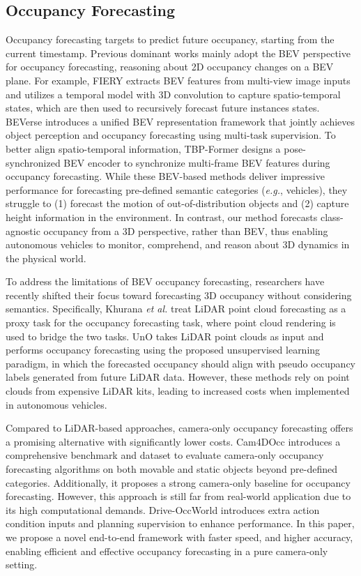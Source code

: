 \vspace{-3pt}
\subsection{Occupancy Forecasting}
\vspace{-3pt}

Occupancy forecasting targets to predict future occupancy, starting from the current timestamp. Previous dominant works mainly adopt the BEV perspective for occupancy forecasting, reasoning about 2D occupancy changes on a BEV plane. For example, FIERY \citep{fiery} extracts BEV features from multi-view image inputs and utilizes a temporal model with 3D convolution to capture spatio-temporal states, which are then used to recursively forecast future instances states. BEVerse \citep{beverse} introduces a unified BEV representation framework that jointly achieves object perception and occupancy forecasting using multi-task supervision. To better align spatio-temporal information, TBP-Former \citep{tbpformer} designs a pose-synchronized BEV encoder to synchronize multi-frame BEV features during occupancy forecasting. While these BEV-based methods deliver impressive performance for forecasting pre-defined semantic categories (\textit{e.g.}, vehicles), they struggle to (1) forecast the motion of out-of-distribution objects and (2) capture height information in the environment. In contrast, our method forecasts class-agnostic occupancy from a 3D perspective, rather than BEV, thus enabling autonomous vehicles to monitor, comprehend, and reason about 3D dynamics in the physical world. 

To address the limitations of BEV occupancy forecasting, researchers have recently shifted their focus toward forecasting 3D occupancy without considering semantics. 
Specifically, Khurana \textit{et al.} \citep{point4docc} treat LiDAR point cloud forecasting as a proxy task for the occupancy forecasting task, where point cloud rendering is used to bridge the two tasks. UnO \citep{uno} takes LiDAR point clouds as input and performs occupancy forecasting using the proposed unsupervised learning paradigm, in which the forecasted occupancy should align with pseudo occupancy labels generated from future LiDAR data. However, these methods rely on point clouds from expensive LiDAR kits, leading to increased costs when implemented in autonomous vehicles. 

Compared to LiDAR-based approaches, camera-only occupancy forecasting offers a promising alternative with significantly lower costs. Cam4DOcc \citep{cam4docc} introduces a comprehensive benchmark and dataset to evaluate camera-only occupancy forecasting algorithms on both movable and static objects beyond pre-defined categories. Additionally, it proposes a strong camera-only baseline for occupancy forecasting.  However, this approach is still far from real-world application due to its high computational demands. Drive-OccWorld \citep{driveoccworld} introduces extra action condition inputs and planning supervision to enhance performance. In this paper, we propose a novel end-to-end framework with faster speed, and higher accuracy, enabling efficient and effective occupancy forecasting in a pure camera-only setting.

\vspace{-3pt}